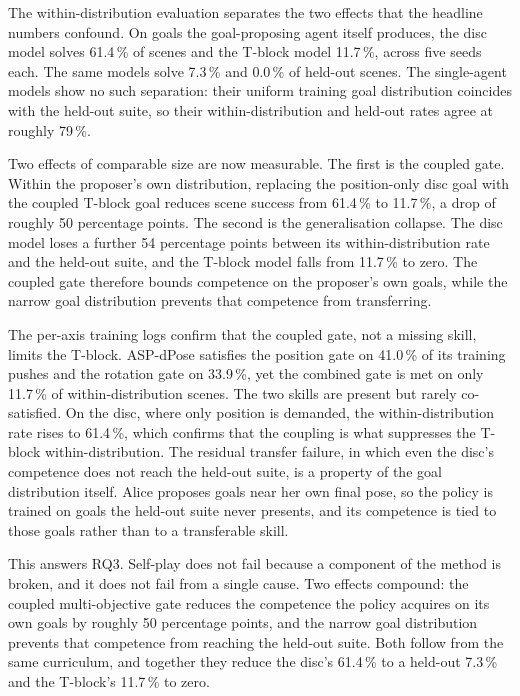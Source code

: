 The within-distribution evaluation separates the two effects that the headline
numbers confound. On goals the goal-proposing agent itself produces, the disc
model solves 61.4\,\% of scenes and the T-block model 11.7\,\%, across five seeds
each. The same models solve 7.3\,\% and 0.0\,\% of held-out scenes. The
single-agent models show no such separation: their uniform training goal
distribution coincides with the held-out suite, so their within-distribution and
held-out rates agree at roughly 79\,\%.

Two effects of comparable size are now measurable. The first is the coupled
gate. Within the proposer's own distribution, replacing the position-only disc
goal with the coupled T-block goal reduces scene success from 61.4\,\% to
11.7\,\%, a drop of roughly 50 percentage points. The second is the
generalisation collapse. The disc model loses a further 54 percentage points
between its within-distribution rate and the held-out suite, and the T-block
model falls from 11.7\,\% to zero. The coupled gate therefore bounds competence
on the proposer's own goals, while the narrow goal distribution prevents that
competence from transferring.

The per-axis training logs confirm that the coupled gate, not a missing skill,
limits the T-block. ASP-dPose satisfies the position gate on 41.0\,\% of its
training pushes and the rotation gate on 33.9\,\%, yet the combined gate is met
on only 11.7\,\% of within-distribution scenes. The two skills are present but
rarely co-satisfied. On the disc, where only position is demanded, the
within-distribution rate rises to 61.4\,\%, which confirms that the coupling is
what suppresses the T-block within-distribution. The residual transfer failure,
in which even the disc's competence does not reach the held-out suite, is a
property of the goal distribution itself. Alice proposes goals near her own final
pose, so the policy is trained on goals the held-out suite never presents, and
its competence is tied to those goals rather than to a transferable skill.

This answers RQ3. Self-play does not fail because a component of the method is
broken, and it does not fail from a single cause. Two effects compound: the
coupled multi-objective gate reduces the competence the policy acquires on its
own goals by roughly 50 percentage points, and the narrow goal distribution
prevents that competence from reaching the held-out suite. Both follow from the
same curriculum, and together they reduce the disc's 61.4\,\% to a held-out
7.3\,\% and the T-block's 11.7\,\% to zero.


